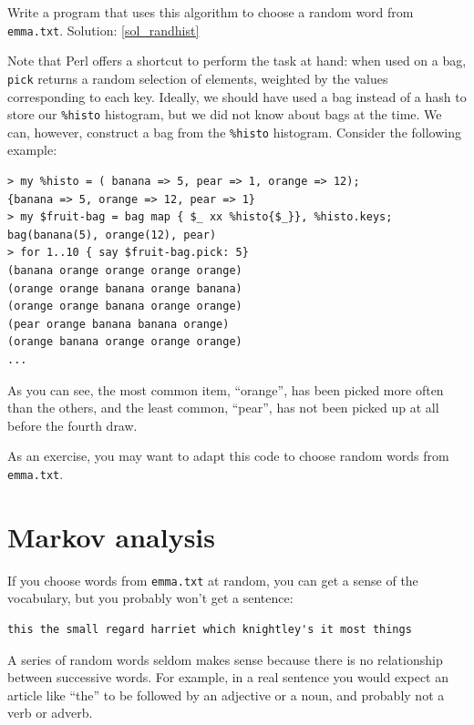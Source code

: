 \begin{exercise}
\label{randhist}

Write a program that uses this algorithm to choose a random 
word from \verb'emma.txt'.  
Solution: \ref{sol_randhist}
\end{exercise}

Note that Perl offers a shortcut to perform the task 
at hand: when used on a bag, {\tt pick} returns a random 
selection of elements, weighted by the values corresponding 
to each key. Ideally, we should have used a bag instead of 
a hash to store our \verb'%histo' histogram, but we did not 
know about bags at the time. We can, however, construct a 
bag from the \verb'%histo' histogram. Consider the following 
example:

\begin{verbatim}
> my %histo = ( banana => 5, pear => 1, orange => 12);
{banana => 5, orange => 12, pear => 1}
> my $fruit-bag = bag map { $_ xx %histo{$_}}, %histo.keys;
bag(banana(5), orange(12), pear)
> for 1..10 { say $fruit-bag.pick: 5}
(banana orange orange orange orange)
(orange orange banana orange banana)
(orange orange banana orange orange)
(pear orange banana banana orange)
(orange banana orange orange orange)
...
\end{verbatim}

As you can see, the most common item, ``orange'', has been 
picked more often than the others, and the least common, 
``pear'', has not been picked up at all before the fourth 
draw. 

As an exercise, you may want to adapt this code to 
choose random words from \verb'emma.txt'.



\section{Markov analysis}
\label{markov}

If you choose words from \verb'emma.txt' at random, you can get a
sense of the vocabulary, but you probably won't get a sentence:

\begin{verbatim}
this the small regard harriet which knightley's it most things
\end{verbatim}
%
A series of random words seldom makes sense because there
is no relationship between successive words.  For example, in
a real sentence you would expect an article like ``the'' to
be followed by an adjective or a noun, and probably not a verb
or adverb.

